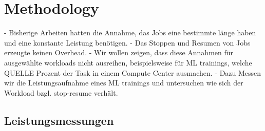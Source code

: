\chapter{Methodology}

- Bisherige Arbeiten hatten die Annahme, das Jobs eine bestimmte länge haben und eine konstante Leistung benötigen.
- Das Stoppen und Resumen von Jobs erzeugte keinen Overhead. 
- Wir wollen zeigen, dass diese Annahmen für ausgewählte workloads nicht ausreihen, beispielsweise für ML trainings, welche QUELLE Prozent der Task in einem Compute Center ausmachen.
- Dazu Messen wir die Leistungsaufnahme eines ML trainings und untersuchen wie sich der Workload bzgl. stop-resume verhält.

\section{Leistungsmessungen}

